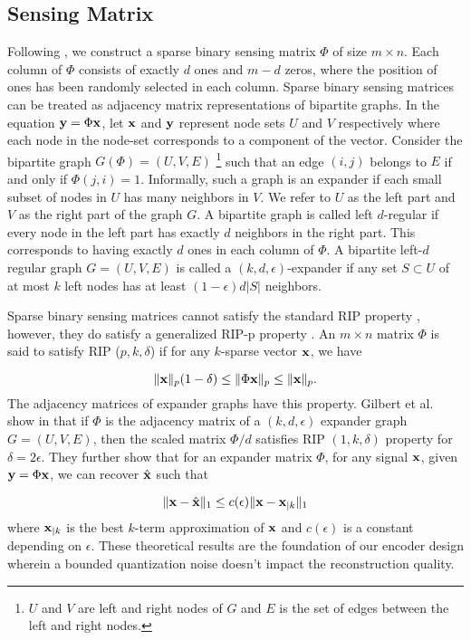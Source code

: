\subsection{Sensing Matrix}
Following \cite{mamaghanian2011compressed},
we construct a sparse binary sensing matrix $\Phi$ of size
$m \times n$.
Each column of $\Phi$ consists of exactly $d$ ones and
$m-d$ zeros, where the position of ones has been randomly
selected in each column.
Sparse binary sensing matrices can be treated as adjacency 
matrix representations of bipartite graphs.
In the equation $\mathbf{y} = \Phi \mathbf{x}$, let $\mathbf{x}$
and $\mathbf{y}$ represent node sets $U$ and $V$
respectively where each node in the node-set
corresponds to a component of the vector.
Consider the bipartite graph $G (\Phi) = (U, V, E)$
\footnote{$U$ and $V$ are left and right nodes of $G$
and $E$ is the set of edges between the left and right nodes.}
such that
an edge $(i, j)$ belongs to $E$ if and only if
$\Phi(j, i) = 1$. Informally, such a graph is
an expander \cite{gilbert2010sparse}
if each small subset of nodes in $U$ has many neighbors
in $V$. We refer to $U$ as the left part and $V$
as the right part of the graph $G$.
A bipartite graph is called left $d$-regular
if every node in the left part has exactly
$d$ neighbors in the right part. This corresponds to having
exactly $d$ ones in each column of $\Phi$.
A bipartite left-$d$ regular graph $G = (U, V, E)$
is called a $(k, d, \epsilon)$-expander if any
set $S \subset U$ of at most $k$ left nodes has
at least $(1-\epsilon)d|S|$ neighbors.

Sparse binary sensing matrices cannot satisfy the standard RIP
property \cite{candes2008restricted},
however, they do satisfy a generalized
RIP-p property \cite{gilbert2010sparse}.
An $m \times n$ matrix $\Phi$ is said to satisfy
RIP ($p, k, \delta$) if for any $k$-sparse vector
$\mathbf{x}$, we have

\begin{equation}
\| \mathbf{x} \|_p (1 - \delta) \leq \| \Phi \mathbf{x} \|_p \leq \| \mathbf{x} \|_p.
\end{equation}
The adjacency matrices of expander graphs have
this property. Gilbert et al. show in \cite{gilbert2010sparse}
that if $\Phi$ is the adjacency matrix of a $(k,d, \epsilon)$
expander graph $G = (U, V, E)$, then the scaled matrix
$\Phi / d$ satisfies RIP $(1,k, \delta)$ property for
$\delta = 2 \epsilon$.
They further show that for an expander matrix $\Phi$,
for any signal $\mathbf{x}$, given $\mathbf{y} = \Phi \mathbf{x}$, we
can recover $\hat{\mathbf{x}}$ such that

$$
\| \mathbf{x} - \hat{\mathbf{x}} \|_1 \leq c(\epsilon) \| \mathbf{x} - \mathbf{x}_{|k} \|_1
$$
where $\mathbf{x}_{|k}$ is the best $k$-term approximation of $\mathbf{x}$
and $c(\epsilon)$ is a constant depending on $\epsilon$.
These theoretical results are the foundation of our encoder
design wherein a bounded quantization noise doesn't impact
the reconstruction quality. 


